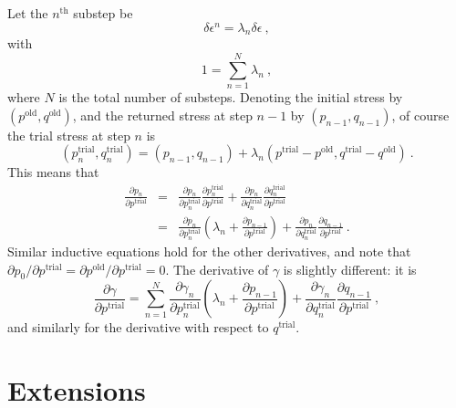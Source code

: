 \documentclass[]{scrreprt}
\begin{document}
Let the $n^{\mathrm{th}}$ substep be
\begin{equation}
\delta\epsilon^{n} = \lambda_{n}\delta\epsilon \ ,
\end{equation}
with
\begin{equation}
1 = \sum_{n=1}^{N}\lambda_{n} \ ,
\end{equation}
where $N$ is the total number of substeps.  Denoting the initial
stress by $(p^{\mathrm{old}}, q^{\mathrm{old}})$, and the returned
stress at step $n-1$ by $(p_{n-1}, q_{n-1})$, of course the trial
stress at step $n$ is
\begin{equation}
(p_{n}^{\mathrm{trial}}, q_{n}^{\mathrm{trial}}) = (p_{n-1},q_{n-1}) +
  \lambda_{n} ( p^{\mathrm{trial}} - p^{\mathrm{old}},
    q^{\mathrm{trial}} - q^{\mathrm{old}}) \ .
\end{equation}
This means that
\begin{eqnarray}
\frac{\partial p_{n}}{\partial p^{\mathrm{trial}}} & = &
\frac{\partial p_{n}}{\partial p_{n}^{\mathrm{trial}}}
\frac{\partial p_{n}^{\mathrm{trial}}}{\partial p^{\mathrm{trial}}}
+ \frac{\partial p_{n}}{\partial q_{n}^{\mathrm{trial}}}
\frac{\partial q_{n}^{\mathrm{trial}}}{\partial p^{\mathrm{trial}}} \\
& = & \frac{\partial p_{n}}{\partial p_{n}^{\mathrm{trial}}}
\left(\lambda_{n} + \frac{\partial p_{n-1}}{\partial p^{\mathrm{trial}}}
\right)
+ \frac{\partial p_{n}}{\partial q_{n}^{\mathrm{trial}}}
\frac{\partial q_{n-1}}{\partial p^{\mathrm{trial}}} \ .
\end{eqnarray}
Similar inductive equations hold for the other derivatives, and note
that $\partial p_{0}/\partial p^{\mathrm{trial}} = \partial
p^{\mathrm{old}}/\partial p^{\mathrm{trial}} = 0$.  The derivative of
$\gamma$ is slightly different: it is
\begin{equation}
\frac{\partial \gamma}{\partial p^{\mathrm{trial}}} = \sum_{n=1}^{N}
\frac{\partial \gamma_{n}}{\partial p_{n}^{\mathrm{trial}}}
\left(\lambda_{n} + \frac{\partial p_{n-1}}{\partial p^{\mathrm{trial}}}
\right)
+ \frac{\partial \gamma_{n}}{\partial q_{n}^{\mathrm{trial}}}
\frac{\partial q_{n-1}}{\partial p^{\mathrm{trial}}} \ ,
\end{equation}
and similarly for the derivative with respect to $q^{\mathrm{trial}}$.



\chapter{Extensions}
\end{document}
